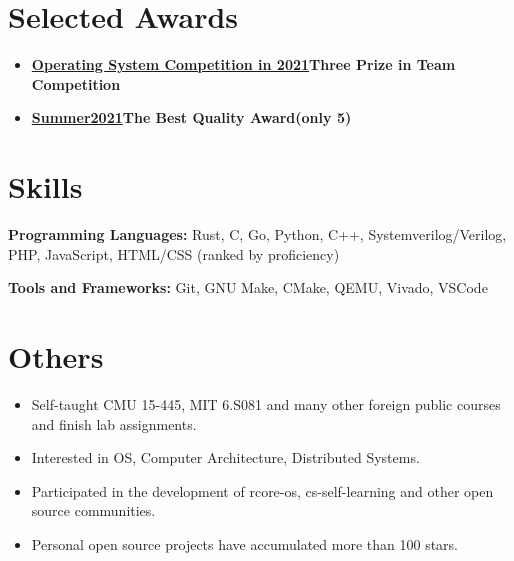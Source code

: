 \documentclass{resume}
\begin{document}


\section{Selected Awards}
\begin{itemize}
  \item \textbf{\href{https://os.educg.net/2021CSCC}{Operating System Competition in 2021}}\quad \textbf{Three Prize in Team Competition}
  \item \textbf{\href{ https://summer-ospp.ac.cn/ }{Summer2021}}\quad \textbf{The Best Quality Award(only 5)}
\end{itemize}



\section{Skills}
\textbf{Programming Languages:} \small Rust, C, Go, Python, C++, Systemverilog/Verilog, PHP, JavaScript, HTML/CSS (ranked by proficiency)

\textbf{Tools and Frameworks:} \small Git, GNU Make, CMake, QEMU, Vivado, VSCode

\section{Others}
\begin{itemize}
  \item Self-taught CMU 15-445, MIT 6.S081 and many other foreign public courses and finish lab assignments.
  \item Interested in OS, Computer Architecture, Distributed Systems.
  \item Participated in the development of rcore-os, cs-self-learning and other open source communities.
  \item Personal open source projects have accumulated more than 100 stars.
\end{itemize}
\end{document}
